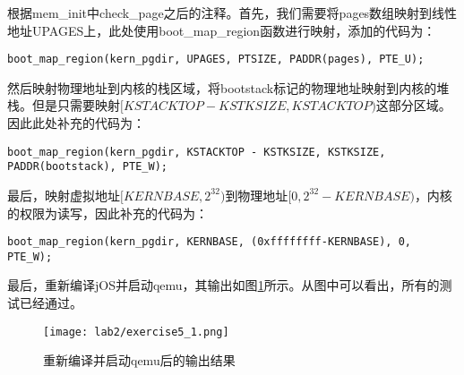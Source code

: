 \begin{exerciseSolution}{5}
    \par 根据mem\_init中check\_page之后的注释。首先，我们需要将pages数组映射到线性地址UPAGES上，此处使用boot\_map\_region函数进行映射，添加的代码为：
    \begin{lstlisting}
boot_map_region(kern_pgdir, UPAGES, PTSIZE, PADDR(pages), PTE_U);
    \end{lstlisting}
    \par 然后映射物理地址到内核的栈区域，将bootstack标记的物理地址映射到内核的堆栈。但是只需要映射$[KSTACKTOP-KSTKSIZE, KSTACKTOP)$这部分区域。因此此处补充的代码为：
    \begin{lstlisting}
boot_map_region(kern_pgdir, KSTACKTOP - KSTKSIZE, KSTKSIZE, PADDR(bootstack), PTE_W);
    \end{lstlisting}

    \par 最后，映射虚拟地址$[KERNBASE, 2^{32})$到物理地址$[0, 2^{32} - KERNBASE)$，内核的权限为读写，因此补充的代码为：
    \begin{lstlisting}
boot_map_region(kern_pgdir, KERNBASE, (0xffffffff-KERNBASE), 0, PTE_W);
    \end{lstlisting}
    \par 最后，重新编译jOS并启动qemu，其输出如图\ref{fig:lab2/exercise5_1}所示。从图中可以看出，所有的测试已经通过。
    \begin{figure}[htb]
        \centering
        \texttt{[image: lab2/exercise5\_1.png]}
        \caption{重新编译并启动qemu后的输出结果}
        \label{fig:lab2/exercise5_1}
    \end{figure}
    \FloatBarrier
\end{exerciseSolution}

